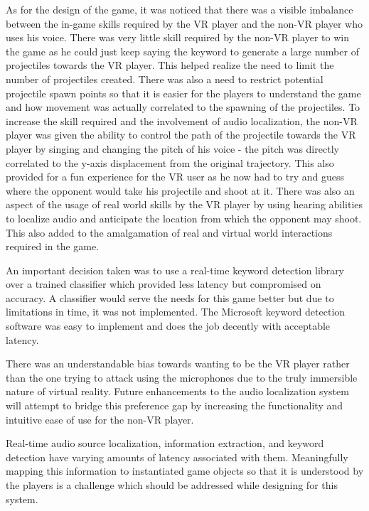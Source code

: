 \documentclass[convention]{aesconf}
\begin{document}
As for the design of the game, it was noticed that there was a visible imbalance between the in-game skills required by the VR player and the non-VR player who uses his voice. There was very little skill required by the non-VR player to win the game as he could just keep saying the keyword to generate a large number of projectiles towards the VR player. This helped realize the need to limit the number of projectiles created. There was also a need to restrict potential projectile spawn points so that it is easier for the players to understand the game and how movement was actually correlated to the spawning of the projectiles. 
To increase the skill required and the involvement of audio localization, the non-VR player was given the ability to control the path of the projectile towards the VR player by singing and changing the pitch of his voice - the pitch was directly correlated to the y-axis displacement from the original trajectory. This also provided for a fun experience for the VR user as he now had to try and guess where the opponent would take his projectile and shoot at it. There was also an aspect of the usage of real world skills by the VR player by using hearing abilities to localize audio and anticipate the location from which the opponent may shoot. This also added to the amalgamation of real and virtual world interactions required in the game.

An important decision taken was to use a real-time keyword detection library over a trained classifier which provided less latency but compromised on accuracy. A classifier would serve the needs for this game better but due to limitations in time, it was not implemented. The Microsoft keyword detection software was easy to implement and does the job decently with acceptable latency.

There was an understandable bias towards wanting to be the VR player rather than the one trying to attack using the microphones due to the truly immersible nature of virtual reality. Future enhancements to the audio localization system will attempt to bridge this preference gap by increasing the functionality and intuitive ease of use for the non-VR player.

Real-time audio source localization, information extraction, and keyword detection have varying amounts of latency associated with them. Meaningfully mapping this information to instantiated game objects so that it is understood by the players is a challenge which should be addressed while designing for this system.
\end{document}
